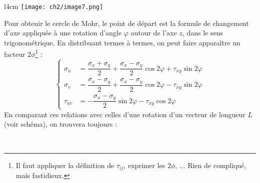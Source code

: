     \begin{wrapfigure}[7]{l}{4cm}
    \texttt{[image: ch2/image7.png]}
    \end{wrapfigure}
    Pour obtenir le cercle de Mohr, le point de départ est la formule de changement d'axe appliquée à une
    rotation d'angle $\varphi$ autour de l'axe $z$, dans le sens trigonométrique. En distribuant termes à
    termes, on peut faire apparaître un facteur $2\phi$\footnote{Il faut appliquer la définition de 
    $\tau_{ij}$, exprimer les $2\phi$, ... Rien de compliqué, mais fastidieux.} :
    \begin{equation}
    \left\{\begin{array}{ll}
    \sigma_u &=  \dfrac{\sigma_x+\sigma_y}{2} + \dfrac{\sigma_x-\sigma_y}{2}\cos 2\varphi + \tau_{xy}\sin
    2\varphi\\
    \sigma_v &=  \dfrac{\sigma_x-\sigma_y}{2} + \dfrac{\sigma_x-\sigma_y}{2}\cos 2\varphi - \tau_{xy}\sin
    2\varphi\\
    \tau_{uv} &= -\dfrac{\sigma_x-\sigma_y}{2}\sin 2\varphi - \tau_{xy}\cos 2\varphi
    \end{array}\right.
    \end{equation}
    En comparant ces relations avec celles d'une rotation d'un vecteur de longueur $L$ (voir schéma), on
    trouvera toujours :
    
    \ \\
    
